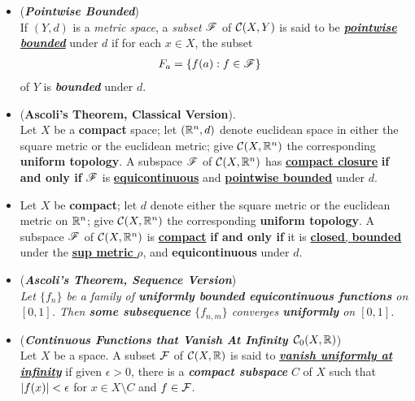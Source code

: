 \documentclass[11pt]{article}
\begin{document}
\begin{itemize}
\item \begin{definition} (\emph{\textbf{Pointwise Bounded}})\\
If $(Y, d)$ is a \emph{metric space}, a \emph{subset} ${\mathscr F}$ of ${\mathcal C}(X, Y)$ is said to be \underline{\emph{\textbf{pointwise bounded}}} under $d$ if for each $x \in X$, the subset
\begin{align*}
F_{a} &= \left\{f(a): f\in {\mathscr F}\right\}
\end{align*}
of $Y$ is \emph{\textbf{bounded}} under $d$.
\end{definition}

\item \begin{theorem} (\textbf{Ascoli’s Theorem, Classical Version}). \citep{munkres2000topology}\\
Let $X$ be a \textbf{compact} space; let $({\mathbb R}^n , d)$ denote euclidean space in either the square metric or the euclidean metric; give ${\mathcal C}(X, {\mathbb R}^n)$ the corresponding \textbf{uniform topology}. A subspace ${\mathscr F}$ of ${\mathcal C}(X, {\mathbb R}^n)$ has \underline{\textbf{compact closure}} \textbf{if and only if} ${\mathscr F}$ is \underline{\textbf{equicontinuous}} and \underline{\textbf{pointwise bounded}} under $d$.
\end{theorem}

\item \begin{corollary}
Let $X$  be  \textbf{compact}; let $d$ denote either the square metric or the euclidean metric on ${\mathbb R}^n$; give ${\mathcal C}(X, {\mathbb R}^n)$ the corresponding \textbf{uniform topology}. A subspace ${\mathscr F}$ of ${\mathcal C}(X, {\mathbb R}^n)$ is \underline{\textbf{compact}} \textbf{if and only if} it is \underline{\textbf{closed}, \textbf{bounded}} under the \underline{\textbf{sup metric} $\rho$}, and \textbf{equicontinuous} under $d$.
\end{corollary}

\item \begin{remark} (\textbf{\emph{Ascoli's Theorem, Sequence Version}}) \citep{reed1980methods}\\
\emph{Let $\{f_n\}$ be a family of \textbf{uniformly bounded equicontinuous functions} on $[0, 1]$. Then \textbf{some subsequence} $\{f_{n,m}\}$ converges \textbf{uniformly} on $[0, 1]$.}
\end{remark}

\item \begin{definition} (\emph{\textbf{Continuous Functions that Vanish At Infinity ${\mathcal C}_0(X, {\mathbb R})$}}) \\
Let $X$ be a space. A subset ${\mathcal F}$ of ${\mathcal C}(X, {\mathbb R})$ is said to \underline{\emph{\textbf{vanish uniformly at infinity}}} if given $\epsilon > 0$, there is a \emph{\textbf{compact subspace}} $C$ of $X$ such that $\left\lvert f(x) \right\rvert < \epsilon$  for $x \in X \setminus C$ and $f \in {\mathcal F}$. 


\end{definition}
\end{itemize}
\end{document}

